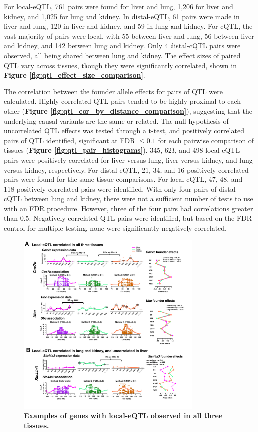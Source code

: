 For local-eQTL, 761 pairs were found for liver and lung, 1,206 for liver and kidney, and 1,025 for lung and kidney. In distal-eQTL, 61 pairs were made in liver and lung, 120 in liver and kidney, and 59 in lung and kidney. For cQTL, the vast majority of pairs were local, with 55 between liver and lung, 56 between liver and kidney, and 142 between lung and kidney. Only 4 distal-cQTL pairs were observed, all being shared between lung and kidney. The effect sizes of paired QTL vary across tissues, though they were significantly correlated, shown in \textbf{Figure \ref{fig:qtl_effect_size_comparison}}.

The correlation between the founder allele effects for pairs of QTL were calculated. Highly correlated QTL pairs tended to be highly proximal to each other (\textbf{Figure \ref{fig:qtl_cor_by_distance_comparison}}), suggesting that the underlying causal variants are the same or related. The null hypothesis of uncorrelated QTL effects was tested through a t-test, and positively correlated pairs of QTL identified, significant at FDR $\leq 0.1$ for each pairwise comparison of tissues (\textbf{Figure \ref{fig:qtl_pair_histograms}}). 345, 623, and 498 local-eQTL pairs were positively correlated for liver versus lung, liver versus kidney, and lung versus kidney, respectively. For distal-eQTL, 21, 34, and 16 positively correlated pairs were found for the same tissue comparisons. For local-cQTL, 47, 48, and 118 positively correlated pairs were identified. With only four pairs of distal-cQTL between lung and kidney, there were not a sufficient number of tests to use with an FDR procedure. However, three of the four pairs had correlations greater than 0.5. Negatively correlated QTL pairs were identified, but based on the FDR control for multiple testing, none were significantly negatively correlated.

\begin{figure}[h]
\renewcommand{\familydefault}{\sfdefault}\normalfont
\centering
\includegraphics[width=0.8\textwidth, trim={0in 0.5in 0in 0in}, clip]{figs/correlated_local_eqtl.pdf}
\caption{\textbf{Examples of genes with local-eQTL observed in all three tissues.}\label{fig:correlated_local_eqtl}}
\end{figure}

